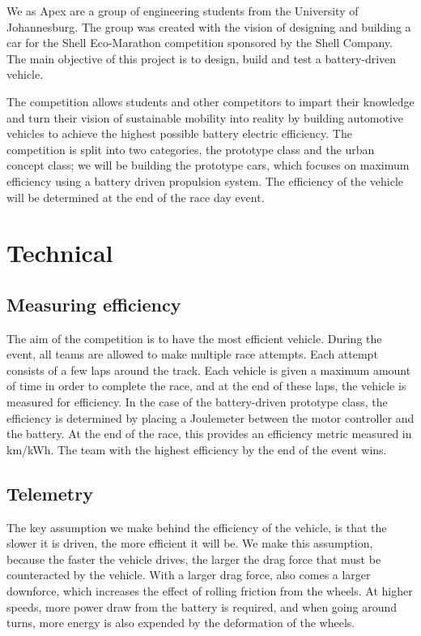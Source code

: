 \documentclass[a4paper, 12pt]{article}
\begin{document}
		We as Apex are a group of engineering students from the University of Johannesburg. The group was created with the vision of designing and building a car for the Shell Eco-Marathon competition sponsored by the Shell Company. The main objective of this project is to design, build and test a battery-driven vehicle.

		The competition allows students and other competitors to impart their knowledge and turn their vision of sustainable mobility into reality by building automotive vehicles to achieve the highest possible battery electric efficiency. The competition is split into two categories, the prototype class and the urban concept class; we will be building the prototype cars, which focuses on maximum efficiency using a battery driven propulsion system. The efficiency of the vehicle will be determined at the end of the race day event.

	\section{Technical} %
	\label{sec:technical}
		\subsection{Measuring efficiency} %
		\label{sub:measuring_efficiency}
			The aim of the competition is to have the most efficient vehicle. During the event, all teams are allowed to make multiple race attempts. Each attempt consists of a few laps around the track. Each vehicle is given a maximum amount of time in order to complete the race, and at the end of these laps, the vehicle is measured for efficiency. In the case of the battery-driven prototype class, the efficiency is determined by placing a Joulemeter between the motor controller and the battery. At the end of the race, this provides an efficiency metric measured in km/kWh. The team with the highest efficiency by the end of the event wins.

		\subsection{Telemetry} %
		\label{sub:telemetry_solution}
			The key assumption we make behind the efficiency of the vehicle, is that the slower it is driven, the more efficient it will be. We make this assumption, because the faster the vehicle drives, the larger the drag force that must be counteracted by the vehicle. With a larger drag force, also comes a larger downforce, which increases the effect of rolling friction from the wheels. At higher speeds, more power draw from the battery is required, and when going around turns, more energy is also expended by the deformation of the wheels. 
\end{document}

